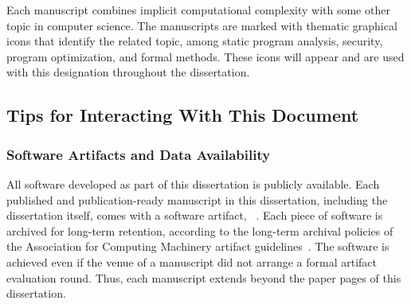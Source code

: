 Each manuscript combines implicit computational complexity with some other topic in computer science.
The manuscripts are marked with thematic graphical icons that identify the related topic, among static program analysis, security, program optimization, and formal methods.
These icons will appear and are used with this designation throughout the dissertation.



\subsection{Tips for Interacting With This Document}
\label{subsec:tips}

\subsubsection{Software Artifacts and Data Availability}\label{subsub:sw}

All software developed as part of this dissertation is publicly available.
Each published and publication-ready manuscript in this dissertation, including the dissertation itself, comes with a software artifact, \cf~.
Each piece of software is archived for long-term retention, according to the long-term archival policies of the Association for Computing Machinery artifact guidelines~\cite{acm_badging}.
The software is achieved even if the venue of a manuscript did not arrange a formal artifact evaluation round.
Thus, each manuscript extends beyond the paper pages of this dissertation.


